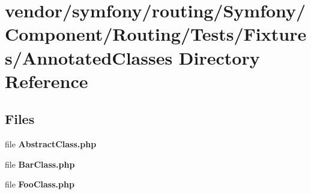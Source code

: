 \section{vendor/symfony/routing/\+Symfony/\+Component/\+Routing/\+Tests/\+Fixtures/\+Annotated\+Classes Directory Reference}
\label{dir_e83aecbc38f863e8747a46eed3a1562d}
\subsection*{Files}
\begin{DoxyCompactItemize}
\item 
file {\bf Abstract\+Class.\+php}
\item 
file {\bf Bar\+Class.\+php}
\item 
file {\bf Foo\+Class.\+php}
\end{DoxyCompactItemize}
